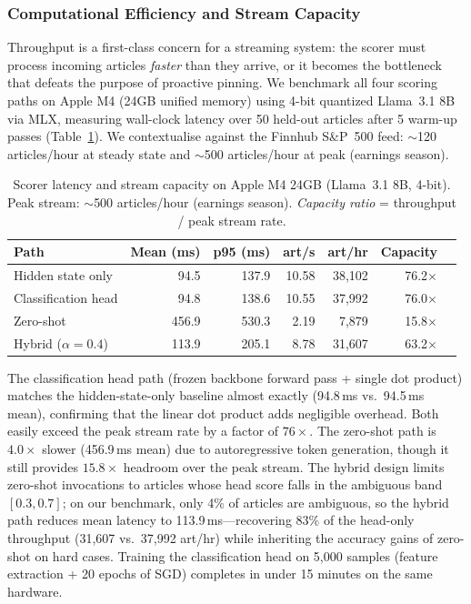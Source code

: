 \documentclass{article}
\begin{document}
\subsubsection{Computational Efficiency and Stream Capacity}

Throughput is a first-class concern for a streaming system: the scorer must process incoming articles \emph{faster} than they arrive, or it becomes the bottleneck that defeats the purpose of proactive pinning.
We benchmark all four scoring paths on Apple M4 (24GB unified memory) using 4-bit quantized Llama~3.1 8B via MLX, measuring wall-clock latency over 50 held-out articles after 5 warm-up passes (Table~\ref{tab:latency}).
We contextualise against the Finnhub S\&P~500 feed: $\sim$120 articles/hour at steady state and $\sim$500 articles/hour at peak (earnings season).

\begin{table}[h]
\centering
\caption{Scorer latency and stream capacity on Apple M4 24GB (Llama~3.1 8B, 4-bit). Peak stream: $\sim$500 articles/hour (earnings season). \emph{Capacity ratio} = throughput / peak stream rate.}
\label{tab:latency}
\small
\begin{tabular}{@{}lrrrrrr@{}}
\toprule
\textbf{Path} & \textbf{Mean (ms)} & \textbf{p95 (ms)} & \textbf{art/s} & \textbf{art/hr} & \textbf{Capacity} \\
\midrule
Hidden state only        &  94.5 & 137.9 & 10.58 & 38{,}102 & 76.2$\times$ \\
Classification head      &  94.8 & 138.6 & 10.55 & 37{,}992 & 76.0$\times$ \\
Zero-shot                & 456.9 & 530.3 &  2.19 &  7{,}879 & 15.8$\times$ \\
Hybrid ($\alpha\!=\!0.4$) & 113.9 & 205.1 &  8.78 & 31{,}607 & 63.2$\times$ \\
\bottomrule
\end{tabular}
\end{table}

The classification head path (frozen backbone forward pass + single dot product) matches the hidden-state-only baseline almost exactly (94.8\,ms vs.\ 94.5\,ms mean), confirming that the linear dot product adds negligible overhead.
Both easily exceed the peak stream rate by a factor of $76\times$.
The zero-shot path is $4.0\times$ slower (456.9\,ms mean) due to autoregressive token generation, though it still provides $15.8\times$ headroom over the peak stream.
The hybrid design limits zero-shot invocations to articles whose head score falls in the ambiguous band $[0.3, 0.7]$; on our benchmark, only 4\% of articles are ambiguous, so the hybrid path reduces mean latency to 113.9\,ms—recovering 83\% of the head-only throughput (31{,}607 vs.\ 37{,}992 art/hr) while inheriting the accuracy gains of zero-shot on hard cases.
Training the classification head on 5,000 samples (feature extraction + 20 epochs of SGD) completes in under 15 minutes on the same hardware.
\end{document}
